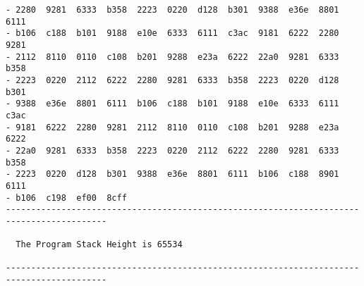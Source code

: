 \begin{verbatim}
- 2280  9281  6333  b358  2223  0220  d128  b301  9388  e36e  8801  6111 
- b106  c188  b101  9188  e10e  6333  6111  c3ac  9181  6222  2280  9281 
- 2112  8110  0110  c108  b201  9288  e23a  6222  22a0  9281  6333  b358 
- 2223  0220  2112  6222  2280  9281  6333  b358  2223  0220  d128  b301 
- 9388  e36e  8801  6111  b106  c188  b101  9188  e10e  6333  6111  c3ac 
- 9181  6222  2280  9281  2112  8110  0110  c108  b201  9288  e23a  6222 
- 22a0  9281  6333  b358  2223  0220  2112  6222  2280  9281  6333  b358 
- 2223  0220  d128  b301  9388  e36e  8801  6111  b106  c188  8901  6111 
- b106  c198  ef00  8cff 
------------------------------------------------------------------------------------------

  The Program Stack Height is 65534  

------------------------------------------------------------------------------------------
\end{verbatim}



